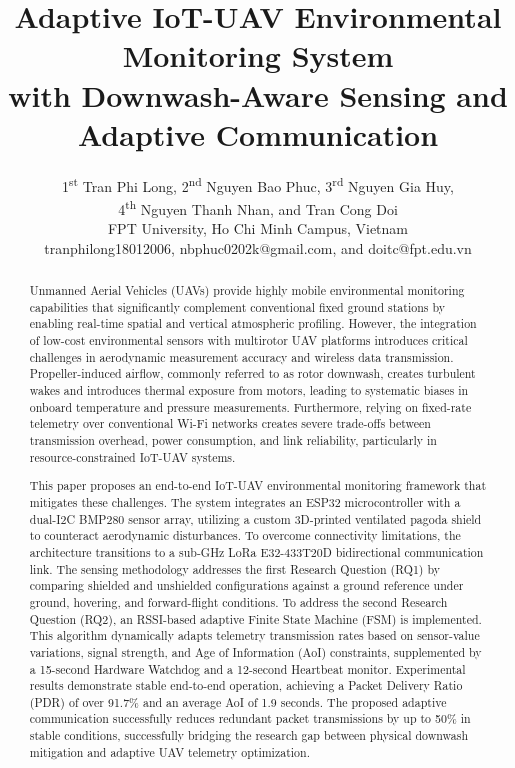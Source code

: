 \documentclass[11pt, a4paper]{article}
\title{Adaptive IoT-UAV Environmental Monitoring System \\ with Downwash-Aware Sensing and Adaptive Communication}
\author{
1\textsuperscript{st} Tran Phi Long, 2\textsuperscript{nd} Nguyen Bao Phuc, 3\textsuperscript{rd} Nguyen Gia Huy, \\
4\textsuperscript{th} Nguyen Thanh Nhan, and Tran Cong Doi \\
FPT University, Ho Chi Minh Campus, Vietnam \\
tranphilong18012006, nbphuc0202k@gmail.com, and doitc@fpt.edu.vn
}
\date{}
\begin{document}
\maketitle


\begin{abstract}
Unmanned Aerial Vehicles (UAVs) provide highly mobile environmental monitoring capabilities that significantly complement conventional fixed ground stations by enabling real-time spatial and vertical atmospheric profiling. However, the integration of low-cost environmental sensors with multirotor UAV platforms introduces critical challenges in aerodynamic measurement accuracy and wireless data transmission. Propeller-induced airflow, commonly referred to as rotor downwash, creates turbulent wakes and introduces thermal exposure from motors, leading to systematic biases in onboard temperature and pressure measurements. Furthermore, relying on fixed-rate telemetry over conventional Wi-Fi networks creates severe trade-offs between transmission overhead, power consumption, and link reliability, particularly in resource-constrained IoT-UAV systems. 

This paper proposes an end-to-end IoT-UAV environmental monitoring framework that mitigates these challenges. The system integrates an ESP32 microcontroller with a dual-I2C BMP280 sensor array, utilizing a custom 3D-printed ventilated pagoda shield to counteract aerodynamic disturbances. To overcome connectivity limitations, the architecture transitions to a sub-GHz LoRa E32-433T20D bidirectional communication link. The sensing methodology addresses the first Research Question (RQ1) by comparing shielded and unshielded configurations against a ground reference under ground, hovering, and forward-flight conditions. To address the second Research Question (RQ2), an RSSI-based adaptive Finite State Machine (FSM) is implemented. This algorithm dynamically adapts telemetry transmission rates based on sensor-value variations, signal strength, and Age of Information (AoI) constraints, supplemented by a 15-second Hardware Watchdog and a 12-second Heartbeat monitor. Experimental results demonstrate stable end-to-end operation, achieving a Packet Delivery Ratio (PDR) of over 91.7\% and an average AoI of 1.9 seconds. The proposed adaptive communication successfully reduces redundant packet transmissions by up to 50\% in stable conditions, successfully bridging the research gap between physical downwash mitigation and adaptive UAV telemetry optimization.
\end{abstract}
\end{document}
